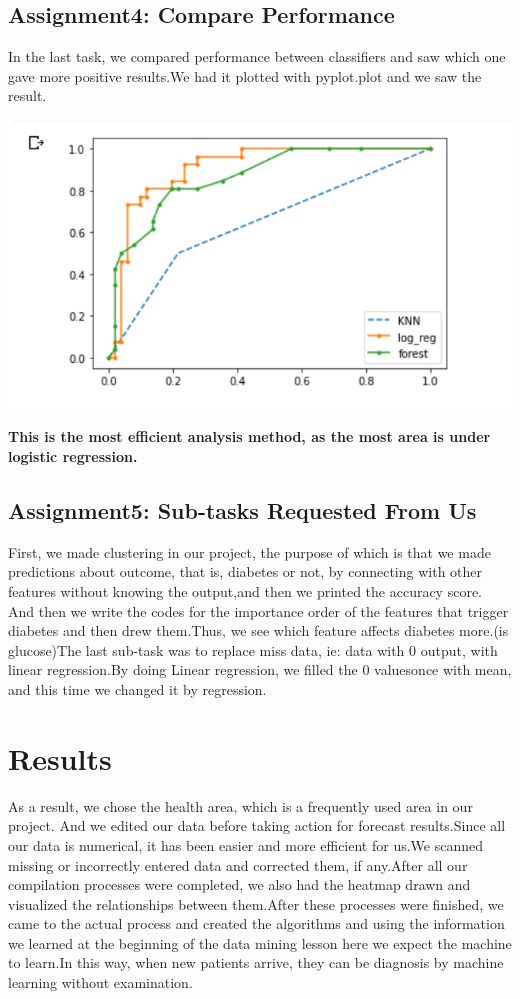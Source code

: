 \documentclass[onecolumn]{article}
\begin{document}
\subsection{Assignment4: Compare Performance }

In the last task, we compared performance between classifiers and saw which one gave more positive results.We had it plotted with pyplot.plot and we saw the result.

\begin{center}
    

   \includegraphics[scale=2,width=.6\linewidth]{compare.png}
  
\textbf{This is the most efficient analysis method, as the most area is under logistic regression.}
\end{center}

\subsection{Assignment5: Sub-tasks Requested From Us }
First, we made clustering in our project, the purpose of which is that we made predictions about outcome, that is, diabetes or not, by connecting with other features without knowing the output,and then we printed the accuracy score.
And then we write the codes for the importance order of the features that trigger diabetes and then drew them.Thus, we see which feature affects diabetes more.(is glucose)The last sub-task was to replace miss data, ie: data with 0 output, with linear regression.By doing Linear regression, we filled the 0 values ​​once with mean, and this time we changed it by regression.

\section{Results}
As a result, we chose the health area, which is a frequently used area in our project. And we edited our data before taking action for forecast results.Since all our data is numerical, it has been easier and more efficient for us.We scanned missing or incorrectly entered data and corrected them, if any.After all our compilation processes were completed, we also had the heatmap drawn and visualized the relationships between them.After these processes were finished, we came to the actual process and created the algorithms and using the information we learned at the beginning of the data mining lesson here we expect the machine to learn.In this way, when new patients arrive, they can be diagnosis by machine learning without examination.
\end{document}
